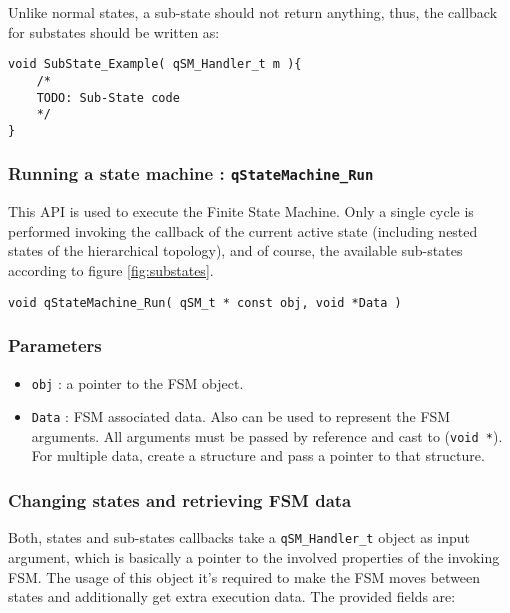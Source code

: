 Unlike normal states, a sub-state should not return anything, thus, the callback for substates should be written as:
\medskip

\begin{lstlisting}[style=CStyle]
void SubState_Example( qSM_Handler_t m ){
    /*
    TODO: Sub-State code
    */
}
\end{lstlisting}  

\subsubsection{Running a state machine : \texorpdfstring{\lstinline{qStateMachine_Run}}{qStateMachine_Run} }
This API  is used to execute the Finite State Machine. Only a single cycle is performed invoking the callback of the current active state (including nested states of the hierarchical topology), and of course, the available sub-states according to figure \ref{fig:substates}. 
\medskip

\begin{lstlisting}[style=CStyle]
void qStateMachine_Run( qSM_t * const obj, void *Data )
\end{lstlisting}

\subsubsection*{Parameters}
\begin{itemize}
    \item \lstinline{obj} : a pointer to the FSM object.
    \item \lstinline{Data} : FSM associated data. Also can be used to represent the FSM arguments. All arguments must be passed by reference and cast to (\lstinline{void *}). For multiple data, create a structure and pass a pointer to that structure.  
\end{itemize}  

\subsubsection{Changing states and retrieving FSM data}
Both, states and sub-states callbacks take a \lstinline{qSM_Handler_t}  object as input argument, which is basically a pointer to the involved properties of the invoking FSM. The usage of this object it's required to make the FSM moves between states and additionally get extra execution data. The provided fields are:

